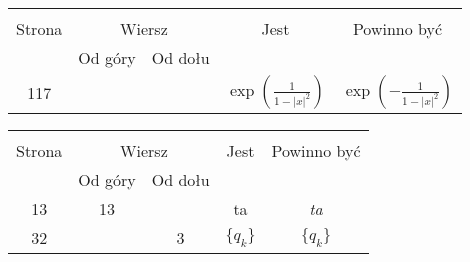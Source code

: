 \documentclass[a4paper,11pt]{article}
\begin{document}
\begin{center}

  \begin{tabular}{|c|c|c|c|c|}
    \hline
    & \multicolumn{2}{c|}{} & & \\
    Strona & \multicolumn{2}{c|}{Wiersz} & Jest
                              & Powinno być \\ \cline{2-3}
    & Od góry & Od dołu & & \\
    \hline
    117 & & & $\exp\left( \frac{ 1 }{ 1 - | x |^{ 2 } } \right)$
           & $\exp\left( -\frac{ 1 }{ 1 - | x |^{ 2 } } \right)$ \\
    \hline
  \end{tabular}

\end{center}

\vspace{\spaceTwo}








\begin{center}

  \begin{tabular}{|c|c|c|c|c|}
    \hline
    & \multicolumn{2}{c|}{} & & \\
    Strona & \multicolumn{2}{c|}{Wiersz} & Jest
                              & Powinno być \\ \cline{2-3}
    & Od góry & Od dołu & & \\
    \hline
    13  & 13 & & ta & \emph{ta} \\
    32  & &  3 & $\boldsymbol{ \{ } q_{ k } \}$ & $\{ q_{ k } \}$ \\
    \hline
  \end{tabular}

\end{center}
\end{document}
